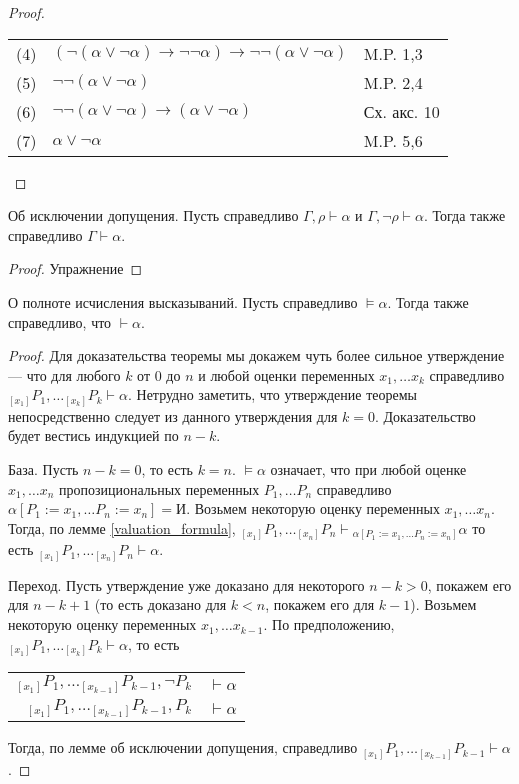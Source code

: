 \begin{proof}
\begin{enumerate}
\begin{tabular}{lll}
(4) & $(\neg(\alpha\vee\neg\alpha) \rightarrow \neg\neg\alpha) \rightarrow \neg\neg(\alpha\vee\neg\alpha)$ & M.P. 1,3\\
(5) & $\neg\neg(\alpha\vee\neg\alpha)$ & M.P. 2,4\\
(6) & $\neg\neg(\alpha\vee\neg\alpha) \rightarrow (\alpha\vee\neg\alpha)$ & Сх. акс. 10\\
(7) & $\alpha\vee\neg\alpha$ & M.P. 5,6
\end{tabular}
\end{enumerate}

\end{proof}

\begin{lemma}{Об исключении допущения.}
Пусть справедливо $\Gamma, \rho \vdash \alpha$ и $\Gamma, \neg \rho \vdash \alpha$.
Тогда также справедливо $\Gamma \vdash \alpha$.
\end{lemma}

\begin{proof}
Упражнение
\end{proof}

\begin{theorem}{О полноте исчисления высказываний.}
Пусть справедливо $\models \alpha$. Тогда также справедливо, что $\vdash \alpha$.
\end{theorem}

\begin{proof}
Для доказательства теоремы мы докажем чуть более сильное утверждение --- что 
для любого $k$ от $0$ до $n$ и любой
оценки переменных $x_1, \dots x_k$ справедливо 
$_{[x_1]} P_1, \dots _{[x_k]} P_k \vdash \alpha$.
Нетрудно заметить, что утверждение теоремы непосредственно следует из данного 
утверждения для $k=0$. 
Доказательство будет вестись индукцией по $n-k$.

База. Пусть $n-k=0$, то есть $k=n$. 
$\models \alpha$ означает, что при любой оценке 
$x_1, \dots x_n$ пропозициональных переменных $P_1, \dots P_n$
справедливо $\alpha [P_1 := x_1, \dots P_n := x_n] = \texttt{И}$.
Возьмем некоторую оценку переменных
$x_1, \dots x_n$. Тогда, по лемме \ref{valuation_formula},
$_{[x_1]} P_1, \dots _{[x_{n}]} P_{n} \vdash {_{\alpha [P_1 := x_1, \dots P_n := x_n]} \alpha}$
то есть $_{[x_1]} P_1, \dots _{[x_{n}]} P_{n} \vdash \alpha$.

Переход. Пусть утверждение уже доказано для некоторого $n-k > 0$, покажем его
для $n-k+1$ (то есть доказано для $k < n$, покажем его для $k-1$).
Возьмем некоторую оценку переменных $x_1, \dots x_{k-1}$.
По предположению, $_{[x_1]} P_1, \dots _{[x_{k}]} P_{k} \vdash \alpha$, то есть

\begin{tabular}{rl}
$_{[x_1]} P_1, \dots _{[x_{k-1}]} P_{k-1}, \neg P_{k}$ & $\vdash \alpha$\\
$_{[x_1]} P_1, \dots _{[x_{k-1}]} P_{k-1}, P_{k}$ & $\vdash \alpha$
\end{tabular}

Тогда, по лемме об исключении допущения, справедливо 
$_{[x_1]} P_1, \dots _{[x_{k-1}]} P_{k-1} \vdash \alpha$.

\end{proof}

